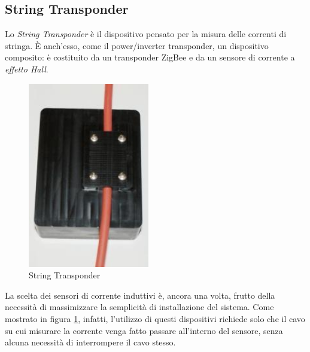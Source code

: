\subsection{String Transponder}
Lo \emph{String Transponder} \`e il dispositivo pensato per la misura delle correnti 
di stringa. \`E anch'esso, come il power/inverter transponder, un dispositivo composito:
\`e costituito da un transponder ZigBee e da un sensore di corrente a \emph{effetto Hall}.
%
\begin{figure}[!h]
\centering
\includegraphics[width=150pt]{img/string-transponder.jpg}
\caption{String Transponder}
\label{string-transponder}
\end{figure}
%
La scelta dei sensori di corrente induttivi \`e, ancora una volta, frutto della 
necessit\`a di massimizzare la semplicit\`a di installazione del sistema. 
%
Come mostrato in figura \ref{string-transponder}, infatti, l'utilizzo di questi dispositivi
richiede solo che il cavo su cui misurare la corrente venga fatto passare all'interno 
del sensore, senza alcuna necessit\`a di interrompere il cavo stesso.
%

















